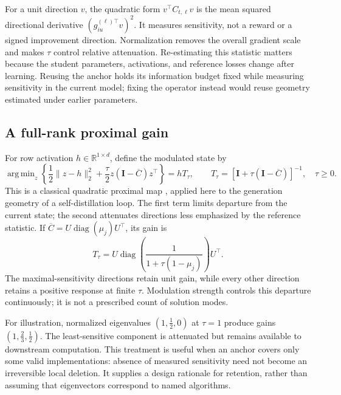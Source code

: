 \documentclass{article}
\newcommand{\R}{\mathbb R}
\newcommand{\I}{\mathbf I}
\newcommand{\Cbar}{\overline C}
\DeclareMathOperator{\diag}{diag}
\DeclareMathOperator*{\argmin}{arg\,min}
\begin{document}
For a unit direction $v$, the quadratic form $v^\top C_{t,\ell}v$ is the mean squared directional derivative $(g_{iu}^{(\ell)\top}v)^2$. It measures sensitivity, not a reward or a signed improvement direction. Normalization removes the overall gradient scale and makes $\tau$ control relative attenuation. Re-estimating this statistic matters because the student parameters, activations, and reference losses change after learning. Reusing the anchor holds its information budget fixed while measuring sensitivity in the current model; fixing the operator instead would reuse geometry estimated under earlier parameters.

\subsection{A full-rank proximal gain}
For row activation $h\in\R^{1\times d}$, define the modulated state by
\begin{equation}
\argmin_z\left\{\frac12\|z-h\|_2^2+
\frac\tau2 z(\I-\Cbar)z^\top\right\}=hT_\tau,
\qquad T_\tau=[\I+\tau(\I-\Cbar)]^{-1},\quad \tau\ge0.
\label{eq:prox}
\end{equation}
This is a classical quadratic proximal map \citep{parikh2014proximal}, applied here to the generation geometry of a self-distillation loop. The first term limits departure from the current state; the second attenuates directions less emphasized by the reference statistic. If $\Cbar=U\diag(\mu_j)U^\top$, its gain is
\begin{equation}
T_\tau=U\diag\!\left(\frac{1}{1+\tau(1-\mu_j)}\right)U^\top.
\label{eq:gain}
\end{equation}
The maximal-sensitivity directions retain unit gain, while every other direction retains a positive response at finite $\tau$. Modulation strength controls this departure continuously; it is not a prescribed count of solution modes.

For illustration, normalized eigenvalues $(1,\tfrac12,0)$ at $\tau=1$ produce gains $(1,\tfrac23,\tfrac12)$. The least-sensitive component is attenuated but remains available to downstream computation. This treatment is useful when an anchor covers only some valid implementations: absence of measured sensitivity need not become an irreversible local deletion. It supplies a design rationale for retention, rather than assuming that eigenvectors correspond to named algorithms.
\end{document}

